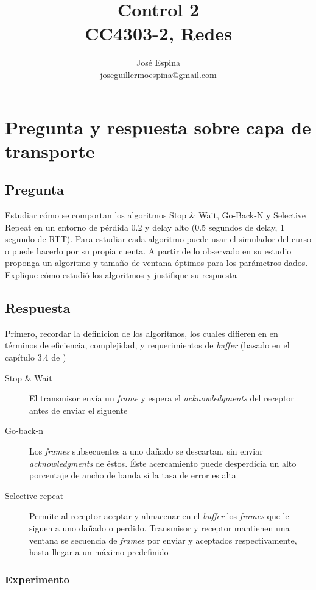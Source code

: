 \documentclass{article}
\begin{document}
\title{Control 2\\CC4303-2, Redes}
\author{José Espina\\joseguillermoespina@gmail.com}
\date{}
\maketitle
\section{Pregunta y respuesta sobre \textbf{capa de transporte}}

\subsection{Pregunta}
Estudiar cómo se comportan los algoritmos Stop \& Wait, Go-Back-N y Selective Repeat en un entorno de pérdida 0.2 y delay alto (0.5 segundos de delay, 1 segundo de RTT). Para estudiar cada algoritmo puede usar el simulador del curso o puede hacerlo por su propia cuenta. A partir de lo observado en su estudio proponga un algoritmo y tamaño de ventana óptimos para los parámetros dados. Explique cómo estudió los algoritmos y justifique su respuesta
\subsection{Respuesta}
Primero, recordar la definicion de los algoritmos, los cuales difieren en en términos de eficiencia, complejidad, y requerimientos de \textit{buffer} (basado en el capítulo 3.4 de \cite{tanenbaum})
\begin{description}
\item[Stop \& Wait] El transmisor envía un \textit{frame} y espera el \textit{acknowledgments} del receptor antes de enviar el siguente
\item[Go-back-n] Los \textit{frames} subsecuentes a uno dañado se descartan, sin enviar \textit{acknowledgments} de éstos. Éste acercamiento puede desperdicia un alto porcentaje de ancho de banda si la tasa de error es alta
\item[Selective repeat] Permite al receptor aceptar y almacenar en el \textit{buffer} los \textit{frames} que le siguen a uno dañado o perdido. Transmisor y receptor mantienen una ventana se secuencia de \textit{frames} por enviar y aceptados respectivamente, hasta llegar a un máximo predefinido
\end{description}

\subsubsection{Experimento}
\end{document}
